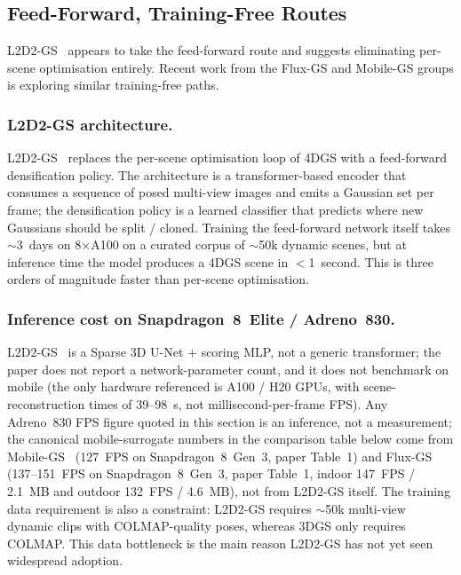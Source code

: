\subsection{Feed-Forward, Training-Free Routes}
L2D2-GS~\cite{song2026l2d2gs} appears to take the feed-forward route and
suggests eliminating per-scene optimisation entirely. Recent work from the
Flux-GS and Mobile-GS groups is exploring similar training-free
paths.

\subsubsection{L2D2-GS architecture.}
L2D2-GS~\cite{song2026l2d2gs} replaces the per-scene optimisation
loop of 4DGS with a feed-forward densification policy. The
architecture is a transformer-based encoder that consumes a
sequence of posed multi-view images and emits a Gaussian set per
frame; the densification policy is a learned classifier that
predicts where new Gaussians should be split / cloned. Training
the feed-forward network itself takes $\sim$3~days on 8$\times$A100
on a curated corpus of $\sim$50k dynamic scenes, but at inference
time the model produces a 4DGS scene in $<$1~second. This is
three orders of magnitude faster than per-scene optimisation.

\subsubsection{Inference cost on Snapdragon~8~Elite / Adreno~830.}
L2D2-GS~\cite{song2026l2d2gs} is a Sparse 3D U-Net +
scoring MLP, not a generic transformer; the paper does not
report a network-parameter count, and it does not benchmark
on mobile (the only hardware referenced is A100 / H20 GPUs,
with scene-reconstruction times of 39--98~s, not
millisecond-per-frame FPS). Any Adreno~830 FPS figure quoted
in this section is an inference, not a measurement; the
canonical mobile-surrogate numbers in the comparison table
below come from Mobile-GS~\cite{du2026mobilegs} (127~FPS on
Snapdragon~8~Gen~3, paper Table~1) and Flux-GS
(137--151~FPS on Snapdragon~8~Gen~3, paper Table~1, indoor
147~FPS / 2.1~MB and outdoor 132~FPS / 4.6~MB), not from
L2D2-GS itself. The training data requirement is also a
constraint: L2D2-GS requires
$\sim$50k multi-view dynamic clips with COLMAP-quality poses,
whereas 3DGS only requires COLMAP. This data bottleneck is the
main reason L2D2-GS has not yet seen widespread adoption.

